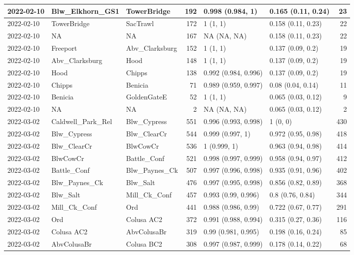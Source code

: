 \documentclass[
]{book}
\theoremstyle{definition}
\theoremstyle{definition}
\theoremstyle{definition}
\theoremstyle{definition}
\theoremstyle{remark}
\begin{document}
\begin{table}
\begin{tabular}[t]{lllrllr}
\hline
2022-02-10 & Blw\_Elkhorn\_GS1 & TowerBridge & 192 & 0.998 (0.984, 1) & 0.165 (0.11, 0.24) & 23\\
\hline
2022-02-10 & TowerBridge & SacTrawl & 172 & 1 (1, 1) & 0.158 (0.11, 0.23) & 22\\
\hline
2022-02-10 & NA & NA & 167 & NA (NA, NA) & 0.158 (0.11, 0.23) & 22\\
\hline
2022-02-10 & Freeport & Abv\_Clarksburg & 152 & 1 (1, 1) & 0.137 (0.09, 0.2) & 19\\
\hline
2022-02-10 & Abv\_Clarksburg & Hood & 148 & 1 (1, 1) & 0.137 (0.09, 0.2) & 19\\
\hline
2022-02-10 & Hood & Chipps & 138 & 0.992 (0.984, 0.996) & 0.137 (0.09, 0.2) & 19\\
\hline
2022-02-10 & Chipps & Benicia & 71 & 0.989 (0.959, 0.997) & 0.08 (0.04, 0.14) & 11\\
\hline
2022-02-10 & Benicia & GoldenGateE & 52 & 1 (1, 1) & 0.065 (0.03, 0.12) & 9\\
\hline
2022-02-10 & NA & NA & 2 & NA (NA, NA) & 0.065 (0.03, 0.12) & 2\\
\hline
2022-03-02 & Caldwell\_Park\_Rel & Blw\_Cypress & 551 & 0.996 (0.993, 0.998) & 1 (0, 0) & 430\\
\hline
2022-03-02 & Blw\_Cypress & Blw\_ClearCr & 544 & 0.999 (0.997, 1) & 0.972 (0.95, 0.98) & 418\\
\hline
2022-03-02 & Blw\_ClearCr & BlwCowCr & 536 & 1 (0.999, 1) & 0.963 (0.94, 0.98) & 414\\
\hline
2022-03-02 & BlwCowCr & Battle\_Conf & 521 & 0.998 (0.997, 0.999) & 0.958 (0.94, 0.97) & 412\\
\hline
2022-03-02 & Battle\_Conf & Blw\_Paynes\_Ck & 507 & 0.997 (0.996, 0.998) & 0.935 (0.91, 0.96) & 402\\
\hline
2022-03-02 & Blw\_Paynes\_Ck & Blw\_Salt & 476 & 0.997 (0.995, 0.998) & 0.856 (0.82, 0.89) & 368\\
\hline
2022-03-02 & Blw\_Salt & Mill\_Ck\_Conf & 457 & 0.993 (0.99, 0.996) & 0.8 (0.76, 0.84) & 344\\
\hline
2022-03-02 & Mill\_Ck\_Conf & Ord & 441 & 0.988 (0.986, 0.99) & 0.722 (0.67, 0.77) & 291\\
\hline
2022-03-02 & Ord & Colusa AC2 & 372 & 0.991 (0.988, 0.994) & 0.315 (0.27, 0.36) & 116\\
\hline
2022-03-02 & Colusa AC2 & AbvColusaBr & 319 & 0.99 (0.981, 0.995) & 0.198 (0.16, 0.24) & 85\\
\hline
2022-03-02 & AbvColusaBr & Colusa BC2 & 308 & 0.997 (0.987, 0.999) & 0.178 (0.14, 0.22) & 68\\

\end{tabular}
\end{table}
\end{document}
